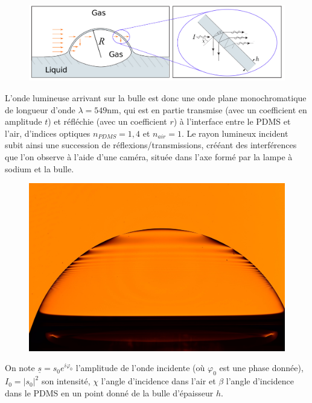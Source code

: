 \documentclass{report}
\begin{document}
\begin{figure}[h]
\centering
  \includegraphics[scale=0.45]{bulle4.png}
\end{figure}

L'onde lumineuse arrivant sur la bulle est donc une onde plane monochromatique de longueur d'onde $\lambda=549$nm, qui est en partie transmise (avec un coefficient en amplitude $t$) et réfléchie (avec un coefficient $r$) à l'interface entre le PDMS et l'air, d'indices optiques $n_{PDMS}=1,4$ et $n_{air}=1$. Le rayon lumineux incident subit ainsi une succession de réflexions/transmissions, crééant des interférences que l'on observe à l'aide d'une caméra, située dans l'axe formé par la lampe à sodium et la bulle. 

\begin{figure}[h]
\centering
  \includegraphics[scale=0.15]{bulle3.jpg}
\end{figure}

On note $\underline{s}=s_0e^{i\varphi_0}$ l'amplitude de l'onde incidente (où $\varphi_0$ est une phase donnée), $I_0=|s_0|^2$ son intensité, $\chi$ l'angle d'incidence dans l'air et $\beta$ l'angle d'incidence dans le PDMS en un point donné de la bulle d'épaisseur $h$.
\end{document}
